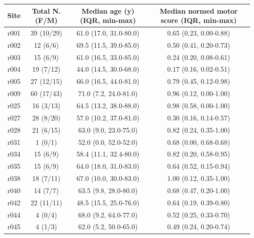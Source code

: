 \documentclass[10pt]{article}
\begin{document}
\begin{table}
\begin{tabular}{cccc}
\toprule
Site & Total N.(F/M) & Median age (y) (IQR, min-max) & Median normed motor score (IQR, min-max) \\
\midrule
r001 &    39 (10/29) &        61.0 (17.0, 31.0-80.0) &                   0.65 (0.23, 0.00-0.88) \\
r002 &      12 (6/6) &        69.5 (11.5, 39.0-85.0) &                   0.50 (0.41, 0.20-0.73) \\
r003 &      15 (6/9) &        61.0 (16.5, 33.0-85.0) &                   0.24 (0.20, 0.08-0.61) \\
r004 &     19 (7/12) &        44.0 (14.5, 30.0-68.0) &                   0.17 (0.16, 0.02-0.51) \\
r005 &    27 (12/15) &        66.0 (16.5, 44.0-81.0) &                   0.79 (0.45, 0.12-0.98) \\
r009 &    60 (17/43) &         71.0 (7.2, 24.0-81.0) &                   0.96 (0.12, 0.00-1.00) \\
r025 &     16 (3/13) &        64.5 (13.2, 38.0-88.0) &                   0.98 (0.58, 0.00-1.00) \\
r027 &     28 (8/20) &        57.0 (10.2, 37.0-81.0) &                   0.30 (0.16, 0.14-0.57) \\
r028 &     21 (6/15) &         63.0 (9.0, 23.0-75.0) &                   0.82 (0.24, 0.35-1.00) \\
r031 &       1 (0/1) &         52.0 (0.0, 52.0-52.0) &                   0.68 (0.00, 0.68-0.68) \\
r034 &      15 (6/9) &        58.4 (11.1, 32.4-80.0) &                   0.82 (0.20, 0.58-0.95) \\
r035 &      15 (6/9) &        64.0 (18.0, 31.0-83.0) &                   0.64 (0.52, 0.15-0.94) \\
r038 &     18 (7/11) &        67.0 (10.0, 30.0-83.0) &                   1.00 (0.12, 0.35-1.00) \\
r040 &      14 (7/7) &         63.5 (9.8, 28.0-80.0) &                   0.68 (0.47, 0.20-1.00) \\
r042 &    22 (11/11) &        48.5 (15.5, 25.0-76.0) &                   0.64 (0.19, 0.39-0.80) \\
r044 &       4 (0/4) &         68.0 (9.2, 64.0-77.0) &                   0.52 (0.25, 0.33-0.70) \\
r045 &       4 (1/3) &         62.0 (5.2, 50.0-65.0) &                   0.49 (0.24, 0.20-0.74) \\

\end{tabular}
\end{table}
\end{document}
